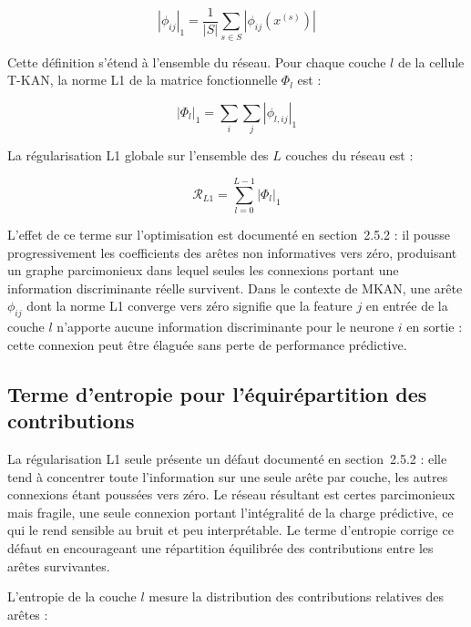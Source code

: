 \documentclass[11pt,a4paper,oneside]{report}
\theoremstyle{definition}
\theoremstyle{remark}
\begin{document}
\begin{equation}
|\phi_{ij}|_1 = \frac{1}{|S|}\sum_{s \in S}|\phi_{ij}(x^{(s)})|
\label{eq:norme-l1-arete}
\end{equation}

Cette définition s'étend à l'ensemble du réseau. Pour chaque couche $l$ de la cellule T-KAN, la norme L1 de la matrice fonctionnelle $\Phi_l$ est :

\begin{equation}
|\Phi_l|_1 = \sum_{i}\sum_{j}|\phi_{l,ij}|_1
\label{eq:norme-l1-couche}
\end{equation}

La régularisation L1 globale sur l'ensemble des $L$ couches du réseau est :

\begin{equation}
\mathcal{R}_{L1} = \sum_{l=0}^{L-1}|\Phi_l|_1
\label{eq:regularisation-l1-globale}
\end{equation}

L'effet de ce terme sur l'optimisation est documenté en section~2.5.2 : il pousse progressivement les coefficients des arêtes non informatives vers zéro, produisant un graphe parcimonieux dans lequel seules les connexions portant une information discriminante réelle survivent. Dans le contexte de MKAN, une arête $\phi_{ij}$ dont la norme L1 converge vers zéro signifie que la feature $j$ en entrée de la couche $l$ n'apporte aucune information discriminante pour le neurone $i$ en sortie : cette connexion peut être élaguée sans perte de performance prédictive.

\subsection{Terme d'entropie pour l'équirépartition des contributions}
\label{subsubsec:entropie-contributions}

La régularisation L1 seule présente un défaut documenté en section~2.5.2 : elle tend à concentrer toute l'information sur une seule arête par couche, les autres connexions étant poussées vers zéro. Le réseau résultant est certes parcimonieux mais fragile, une seule connexion portant l'intégralité de la charge prédictive, ce qui le rend sensible au bruit et peu interprétable. Le terme d'entropie corrige ce défaut en encourageant une répartition équilibrée des contributions entre les arêtes survivantes.

L'entropie de la couche $l$ mesure la distribution des contributions relatives des arêtes :
\end{document}
